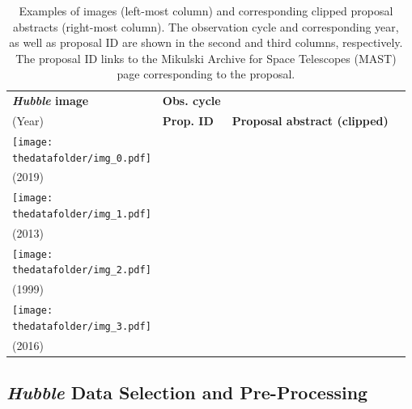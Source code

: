 \documentclass[10pt]{article} %
\newcommand{\hubble}{\emph{Hubble}\xspace}
\begin{document}
\begin{table}[h!]
  \centering
  \begin{tabular}{m{} p{1.9cm} p{1.9cm} m{8cm}}
      \toprule
      \centering \bfseries \hubble image & \centering \bfseries Obs. cycle \\ (Year) & \centering \bfseries Prop. ID & \centering \bfseries Proposal abstract (clipped) \tabularnewline
      \midrule
      \centering \texttt{[image: \\thedatafolder/img\_0.pdf]} & \centering  \\ (2019) & \centering  &  {\scriptsize } \tabularnewline
      \midrule
      \centering \texttt{[image: \\thedatafolder/img\_1.pdf]} & \centering  \\ (2013) & \centering  &  {\scriptsize } \tabularnewline
      \midrule
      \centering \texttt{[image: \\thedatafolder/img\_2.pdf]} & \centering  \\ (1999) & \centering  &  {\scriptsize } \tabularnewline
      \midrule
      \centering \texttt{[image: \\thedatafolder/img\_3.pdf]} & \centering  \\ (2016) & \centering  &  {\scriptsize } \tabularnewline
      \bottomrule
  \end{tabular}
  \caption{Examples of images (left-most column) and corresponding clipped proposal abstracts (right-most column). The observation cycle and corresponding year, as well as proposal ID are shown in the second and third columns, respectively. The proposal ID links to the Mikulski Archive for Space Telescopes (MAST) page corresponding to the proposal.}
  \label{tab:dataset}
\end{table}


\subsection{\hubble Data Selection and Pre-Processing}
\end{document}

